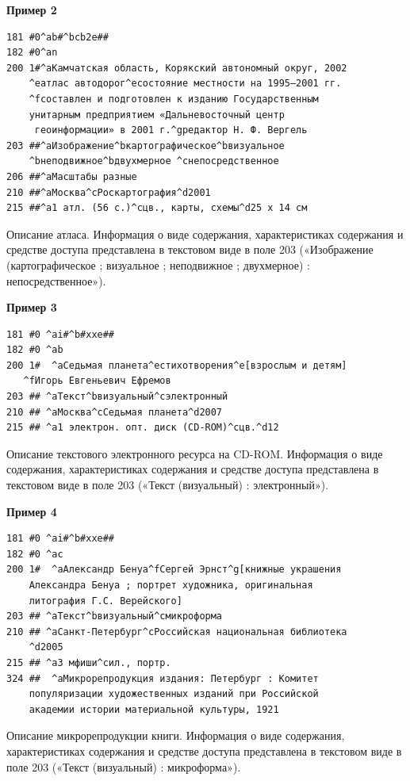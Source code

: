\textbf{Пример 2}

\begin{verbatim}
181 #0^ab#^bcb2e##
182 #0^an
200 1#^aКамчатская область, Корякский автономный округ, 2002
    ^eатлас автодорог^eсостояние местности на 1995–2001 гг.
    ^fсоставлен и подготовлен к изданию Государственным 
    унитарным предприятием «Дальневосточный центр
     геоинформации» в 2001 г.^gредактор Н. Ф. Вергель
203 ##^aИзображение^bкартографическое^bвизуальное
    ^bнеподвижное^bдвухмерное ^cнепосредственное
206 ##^aМасштабы разные
210 ##^aМосква^cРоскартография^d2001
215 ##^a1 атл. (56 с.)^cцв., карты, схемы^d25 x 14 см
\end{verbatim}

Описание атласа. Информация о виде содержания, характеристиках содержания и средстве доступа представлена в текстовом виде в поле 203 («Изображение (картографическое ; визуальное ; неподвижное ; двухмерное) : непосредственное»).

\textbf{Пример 3}

\begin{verbatim}
181 #0 ^ai#^b#xxe##
182 #0 ^ab
200 1#	^aСедьмая планета^eстихотворения^e[взрослым и детям]
   ^fИгорь Евгеньевич Ефремов
203 ## ^aТекст^bвизуальный^сэлектронный
210 ## ^aМосква^cСедьмая планета^d2007
215 ## ^a1 электрон. опт. диск (CD-ROM)^cцв.^d12
\end{verbatim}

Описание текстового электронного ресурса на CD-ROM. Информация о виде содержания, характеристиках содержания и средстве доступа представлена в текстовом виде в поле 203 («Текст (визуальный) : электронный»).

\textbf{Пример 4}

\begin{verbatim}
181 #0 ^ai#^b#xxe##
182 #0 ^ac
200 1#	^aАлександр Бенуа^fСергей Эрнст^g[книжные украшения
    Александра Бенуа ; портрет художника, оригинальная
    литография Г.С. Верейского]
203 ## ^aТекст^bвизуальный^смикроформа
210 ## ^aСанкт-Петербург^cРоссийская национальная библиотека
    ^d2005
215 ## ^a3 мфиши^cил., портр.
324 ##	^aМикрорепродукция издания: Петербург : Комитет
    популяризации художественных изданий при Российской
    академии истории материальной культуры, 1921
\end{verbatim}

Описание микрорепродукции книги. Информация о виде содержания, характеристиках содержания и средстве доступа представлена в текстовом виде в поле 203 («Текст (визуальный) : микроформа»).

